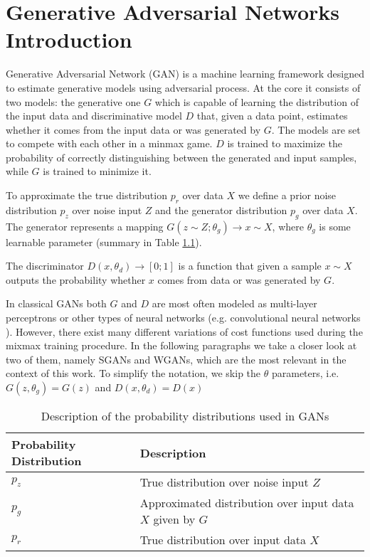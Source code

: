 \chapter{Generative Adversarial Networks Introduction}\label{chapter:gans}
Generative Adversarial Network (GAN)\cite{goodfellow2014generative} is a
machine learning framework designed to estimate generative models using
adversarial process. At the core it consists of two models: the generative one
$G$ which is capable of learning the distribution of the input data and
discriminative model $D$ that, given a data point, estimates whether it comes
from the input data or was generated by $G$. The models are set to compete with each
other in a minmax game. $D$ is trained to maximize the probability of correctly
distinguishing between the generated and input samples, while $G$ is trained to
minimize it.  

To approximate the true distribution $p_r$ over data $X$ we define a prior noise
distribution $p_z$ over noise input $Z$ and the generator distribution $p_g$
over data $X$. The generator represents a mapping
$G(z \sim Z; \theta_g) \to x \sim X$, where $\theta_g$ is some learnable
parameter (summary in Table \ref{tab:gan_probabilities}).

The discriminator $D(x, \theta_d) \to [0;1]$ is a function that given a sample $x
\sim X$ outputs the probability whether $x$ comes from data or was generated by
$G$. 

In classical GANs both $G$ and $D$ are most often modeled as multi-layer
perceptrons\cite{goodfellow2014generative} or other types of neural networks
(e.g. convolutional neural networks \cite{radford2016unsupervised}). However,
there exist many different variations of cost functions used during the mixmax
training procedure. In the following paragraphs we take a closer look at two of
them, namely SGANs and WGANs, which are the most relevant in the context of this
work. To simplify the notation, we skip the $\theta$ parameters, i.e. $G(z,
\theta_g) = G(z)$ and $D(x, \theta_d) = D(x)$
\begin{table}[]
  \centering
  \begin{tabular}{|l|l|}
    \hline
    Probability Distribution & Description  \\ \hline
    $p_z$ & True distribution over noise input $Z$ \\ \hline
    $p_g$&  Approximated distribution over input data $X$ given by $G$ \\ \hline
    $p_r$&  True distribution over input data $X$\\ \hline
  \end{tabular}
  \caption{\label{tab:gan_probabilities} Description of the probability
    distributions used in GANs}
\end{table}

